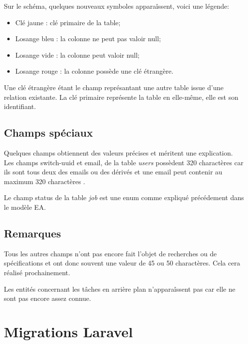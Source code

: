 \documentclass[
    iai, %
    il, %
]{heig-tb}
\begin{document}
Sur le schéma, quelques nouveaux symboles apparaîssent, voici une légende:
\begin{itemize}
    \item Clé jaune : clé primaire de la table;
    \item Losange bleu : la colonne ne peut pas valoir null;
    \item Losange vide : la colonne peut valoir null;
    \item Losange rouge : la colonne possède une clé étrangère.
\end{itemize}

Une clé étrangère étant le champ représantant une autre table issue d'une relation existante. La clé primaire représente la table en elle-même, elle est son identifiant.

\subsection{Champs spéciaux}
Quelques champs obtiennent des valeurs précises et méritent une explication.\\
Les champs switch-uuid et email, de la table \emph{users} possèdent 320 charactères car ils sont tous
deux des emails ou des dérivés et une email peut contenir au maximum 320 charactères \cite{email-length}.

Le champ status de la table \emph{job} est une enum comme expliqué précédement dans le modèle EA.

\subsection{Remarques}
Tous les autres champs n'ont pas encore fait l'objet de recherches ou de spécifications et ont donc souvent une valeur de 45 ou 50 charactères. Cela cera réalisé prochainement.

Les entités concernant les tâches en arrière plan n'apparaîssent pas car elle ne sont pas encore assez connue.



\section{Migrations Laravel}
\end{document}
